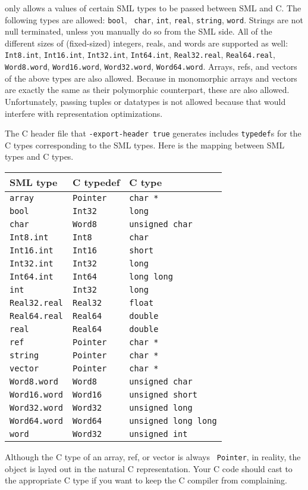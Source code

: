 {\mlton} only allows a values of certain SML types to be passed
between SML and C.  The following types are allowed: {\tt bool}, {\tt
char}, {\tt int}, {\tt real}, {\tt string}, {\tt word}.  Strings are
not null terminated, unless you manually do so from the SML side.  All
of the different sizes of (fixed-sized) integers, reals, and words are
supported as well: {\tt Int8.int}, {\tt Int16.int}, {\tt Int32.int},
{\tt Int64.int}, {\tt Real32.real}, {\tt Real64.real}, {\tt
Word8.word}, {\tt Word16.word}, {\tt Word32.word}, {\tt Word64.word}.
Arrays, refs, and vectors of the above types are also allowed.
Because in {\mlton} monomorphic arrays and vectors are exactly the
same as their polymorphic counterpart, these are also allowed.
Unfortunately, passing tuples or datatypes is not allowed because that
would interfere with representation optimizations.

The C header file that {\tt -export-header true} generates includes
{\tt typedef}s for the C types corresponding to the SML types.  Here
is the mapping between SML types and C types.

\begin{center}
\begin{tabular}{l|l|l}
SML type & C typedef & C type\\
\hline
{\tt array} & {\tt Pointer} & {\tt char *} \\
{\tt bool} & {\tt Int32} & {\tt long} \\
{\tt char} & {\tt Word8} & {\tt unsigned char} \\
{\tt Int8.int} & {\tt Int8} & {\tt char} \\
{\tt Int16.int} & {\tt Int16} & {\tt short} \\
{\tt Int32.int} & {\tt Int32} & {\tt long} \\
{\tt Int64.int} & {\tt Int64} & {\tt long long} \\
{\tt int} & {\tt Int32} & {\tt long} \\
{\tt Real32.real} & {\tt Real32} & {\tt float} \\
{\tt Real64.real} & {\tt Real64} & {\tt double} \\
{\tt real} & {\tt Real64} & {\tt double} \\
{\tt ref} & {\tt Pointer} & {\tt char *} \\
{\tt string} & {\tt Pointer} & {\tt char *} \\
{\tt vector} & {\tt Pointer} & {\tt char *} \\
{\tt Word8.word} & {\tt Word8} & {\tt unsigned char} \\
{\tt Word16.word} & {\tt Word16} & {\tt unsigned short} \\
{\tt Word32.word} & {\tt Word32} & {\tt unsigned long} \\
{\tt Word64.word} & {\tt Word64} & {\tt unsigned long long} \\
{\tt word} & {\tt Word32} & {\tt unsigned int} \\
\end{tabular}
\end{center}

Although the C type of an array, ref, or vector is always {\tt
Pointer}, in reality, the object is layed out in the natural C
representation.  Your C code should cast to the appropriate C type if
you want to keep the C compiler from complaining.
